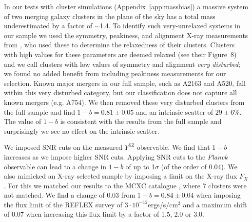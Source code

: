 \documentclass[useAMS,usenatbib]{mnras}
\begin{document}
In our tests with cluster simulations (Appendix~\ref{app:massbias}) a massive system of two merging galaxy clusters in the plane of the sky has a total mass underestimated by a factor of $\sim$1.4. To identify such very-unrelaxed systems in our sample we used the symmetry, peakiness, and alignment X-ray measurements from \citet{mantz15b}, who used these to determine the relaxedness of their clusters. Clusters with high values for these parameters are deemed relaxed (see their Figure~8) and we call clusters with low values of symmetry and alignment \textit{very disturbed}; we found no added benefit from including peakiness measurements for our selection. Known major mergers in our full sample, such as A2163 and A520, fall within this very disturbed category, but our classification does not capture all known mergers (e.g. A754). We then removed these very disturbed clusters from the full sample and find $1-b=0.81\pm0.05$ and an intrinsic scatter of $29\pm6$\%. The value of $1-b$ is consistent with the results from the full sample and surprisingly we see no effect on the intrinsic scatter.

We imposed SNR cuts on the measured $Y^\mathrm{SZ}$ observable. We find that $1-b$ increases as we impose higher SNR cuts. Applying SNR cuts to the \textit{Planck} observable can lead to a change in $1-b$ of up to 1$\sigma$ (of the order of 0.04). 
We also mimicked an X-ray selected sample by imposing a limit on the X-ray flux $F_X$. For this we matched our results to the MCXC catalogue \citep{piffaretti11}, where 7 clusters were not matched. We find a change of 0.03 from $1-b=0.84\pm0.04$ when imposing the flux limit of the REFLEX survey \citep{bohringer04} of $3\cdot10^{-12} $ergs/s/cm$^2$ and a maximum shift of 0.07 when increasing this flux limit by a factor of 1.5, 2.0 or 3.0. 
\end{document}
